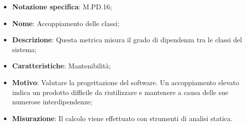 \begin{itemize}
    \item \textbf{Notazione specifica}: M.PD.16;
    \item \textbf{Nome}: Accoppiamento delle classi;
    \item \textbf{Descrizione}: Questa metrica misura il grado di dipendenza tra le classi del sistema;
    \item \textbf{Caratteristiche}: Mantenibilità;
    \item \textbf{Motivo}: Valutare la progettazione del software. Un accoppiamento elevato indica un prodotto difficile da riutilizzare e mantenere a causa delle sue numerose interdipendenze;
    \item \textbf{Misurazione}: Il calcolo viene effettuato con strumenti di analisi statica.
\end{itemize}
